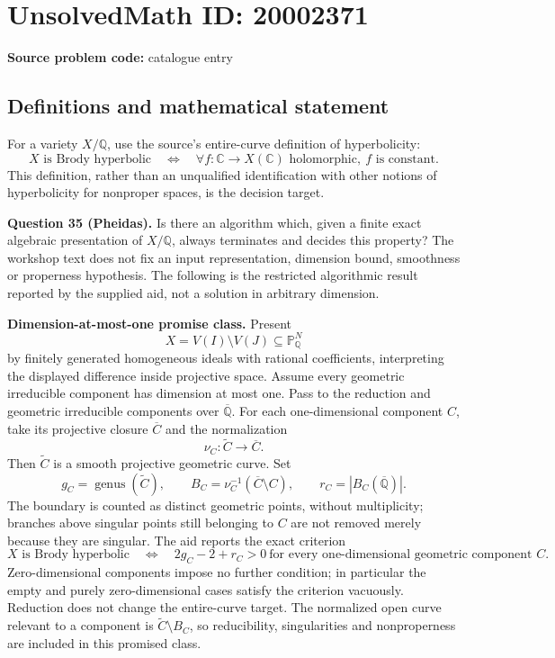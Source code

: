 \documentclass[11pt]{article}
\newcommand{\Q}{\mathbb{Q}}
\newcommand{\C}{\mathbb{C}}
\newcommand{\PP}{\mathbb{P}}
\begin{document}
\section*{UnsolvedMath ID: 20002371}
\textbf{Source problem code:} catalogue entry
\subsection{Definitions and mathematical statement}
For a variety \(X/\Q\), use the source's entire-curve definition of hyperbolicity:
\[
 X\text{ is Brody hyperbolic}\quad\Longleftrightarrow\quad
 \forall f:\C\longrightarrow X(\C)\text{ holomorphic},\ f\text{ is constant}.
\]
This definition, rather than an unqualified identification with other notions of hyperbolicity for nonproper spaces, is the decision target.

\textbf{Question 35 (Pheidas).} Is there an algorithm which, given a finite exact algebraic presentation of \(X/\Q\), always terminates and decides this property? The workshop text does not fix an input representation, dimension bound, smoothness or properness hypothesis. The following is the restricted algorithmic result reported by the supplied aid, not a solution in arbitrary dimension.

\textbf{Dimension-at-most-one promise class.} Present
\[
 X=V(I)\setminus V(J)\subseteq\PP^N_{\Q}
\]
by finitely generated homogeneous ideals with rational coefficients, interpreting the displayed difference inside projective space. Assume every geometric irreducible component has dimension at most one. Pass to the reduction and geometric irreducible components over \(\overline{\Q}\). For each one-dimensional component \(C\), take its projective closure \(\overline C\) and the normalization
\[
 \nu_C:\widetilde C\longrightarrow\overline C.
\]
Then \(\widetilde C\) is a smooth projective geometric curve. Set
\[
 g_C=\operatorname{genus}(\widetilde C),\qquad
 B_C=\nu_C^{-1}(\overline C\setminus C),\qquad
 r_C=|B_C(\overline{\Q})|.
\]
The boundary is counted as distinct geometric points, without multiplicity; branches above singular points still belonging to \(C\) are not removed merely because they are singular. The aid reports the exact criterion
\[
 X\text{ is Brody hyperbolic}\quad\Longleftrightarrow\quad
 2g_C-2+r_C>0\ \text{for every one-dimensional geometric component }C.
\]
Zero-dimensional components impose no further condition; in particular the empty and purely zero-dimensional cases satisfy the criterion vacuously. Reduction does not change the entire-curve target. The normalized open curve relevant to a component is \(\widetilde C\setminus B_C\), so reducibility, singularities and nonproperness are included in this promised class.
\end{document}
